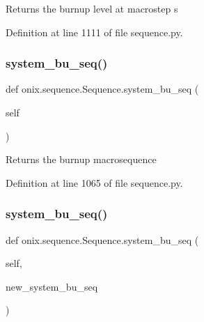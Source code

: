 \begin{DoxyVerb}Returns the burnup level at macrostep s\end{DoxyVerb}
 

Definition at line 1111 of file sequence.\+py.

\mbox{\label{classonix_1_1sequence_1_1Sequence_a43a37d2c202a4a5b912d7ada5c528e0e}} 
\subsubsection{\texorpdfstring{system\+\_\+bu\+\_\+seq()}{system\_bu\_seq()}\hspace{0.1cm}{\footnotesize\ttfamily [1/2]}}
{\footnotesize\ttfamily def onix.\+sequence.\+Sequence.\+system\+\_\+bu\+\_\+seq (\begin{DoxyParamCaption}\item[{}]{self }\end{DoxyParamCaption})}

\begin{DoxyVerb}Returns the burnup macrosequence
\end{DoxyVerb}
 

Definition at line 1065 of file sequence.\+py.

\mbox{\label{classonix_1_1sequence_1_1Sequence_af2f0256afee29b6ad9b07153f2bb7c81}} 
\subsubsection{\texorpdfstring{system\+\_\+bu\+\_\+seq()}{system\_bu\_seq()}\hspace{0.1cm}{\footnotesize\ttfamily [2/2]}}
{\footnotesize\ttfamily def onix.\+sequence.\+Sequence.\+system\+\_\+bu\+\_\+seq (\begin{DoxyParamCaption}\item[{}]{self,  }\item[{}]{new\+\_\+system\+\_\+bu\+\_\+seq }\end{DoxyParamCaption})}

